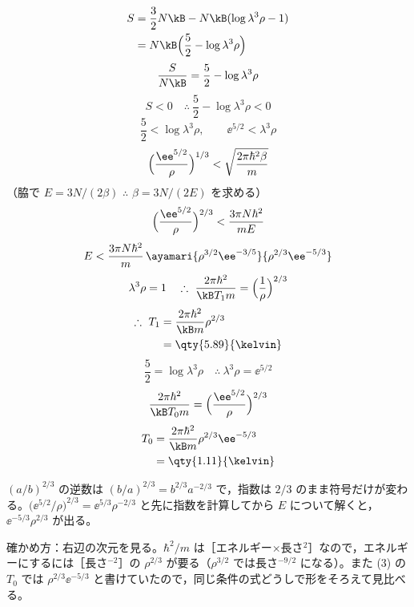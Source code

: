 \begin{align*}
S&=\frac{3}{2}N\kB-N\kB(\log\lambda^{3}\rho-1)\\
&=N\kB\Bigl(\frac{5}{2}-\log\lambda^{3}\rho\Bigr)
\end{align*}
\[ \frac{S}{N\kB}=\frac{5}{2}-\log\lambda^{3}\rho \]
\[ S<0\quad\therefore\ \frac{5}{2}-\log\lambda^{3}\rho<0 \]
\[ \frac{5}{2}<\log\lambda^{3}\rho,\qquad \ee^{5/2}<\lambda^{3}\rho \]
\[ \Bigl(\frac{\ee^{5/2}}{\rho}\Bigr)^{1/3}<\sqrt{\frac{2\pi\hbar^{2}\beta}{m}} \]
（脇で $E=3N/(2\beta)$ $\therefore$ $\beta=3N/(2E)$ を求める）
\[ \Bigl(\frac{\ee^{5/2}}{\rho}\Bigr)^{2/3}<\frac{3\pi N\hbar^{2}}{mE} \]
\[ E<\frac{3\pi N\hbar^{2}}{m}\,\ayamari{\rho^{3/2}\ee^{-3/5}}{\rho^{2/3}\ee^{-5/3}} \]
\[ \lambda^{3}\rho=1\quad\therefore\ \frac{2\pi\hbar^{2}}{\kB T_1m}=\Bigl(\frac{1}{\rho}\Bigr)^{2/3} \]
\begin{align*}
\therefore\ T_1&=\frac{2\pi\hbar^{2}}{\kB m}\rho^{2/3}\\
&=\qty{5.89}{\kelvin}
\end{align*}
\[ \frac{5}{2}=\log\lambda^{3}\rho\quad\therefore\ \lambda^{3}\rho=\ee^{5/2} \]
\[ \frac{2\pi\hbar^{2}}{\kB T_0m}=\Bigl(\frac{\ee^{5/2}}{\rho}\Bigr)^{2/3} \]
\begin{align*}
T_0&=\frac{2\pi\hbar^{2}}{\kB m}\rho^{2/3}\ee^{-5/3}\\
&=\qty{1.11}{\kelvin}
\end{align*}
\item $(a/b)^{2/3}$ の逆数は $(b/a)^{2/3}=b^{2/3}a^{-2/3}$ で，指数は $2/3$ のまま符号だけが変わる。$\bigl(\ee^{5/2}/\rho\bigr)^{2/3}=\ee^{5/3}\rho^{-2/3}$ と先に指数を計算してから $E$ について解くと，$\ee^{-5/3}\rho^{2/3}$ が出る。
\item 確かめ方：右辺の次元を見る。$\hbar^{2}/m$ は［エネルギー×長さ$^{2}$］なので，エネルギーにするには［長さ$^{-2}$］の $\rho^{2/3}$ が要る（$\rho^{3/2}$ では長さ$^{-9/2}$ になる）。また (3) の $T_0$ では $\rho^{2/3}\ee^{-5/3}$ と書けていたので，同じ条件の式どうしで形をそろえて見比べる。
